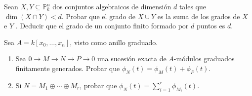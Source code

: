 \documentclass[twoside]{article}
\begin{document}
\newpage

\begin{ejercicio}{2}
 
Sean $X, Y ⊆ \mathbb{P}^n_k$
dos conjuntos algebraicos de dimensión $d$ tales
que $\dim(X ∩Y ) < d$. Probar que el grado de $X ∪Y$ es la suma de los grados de
$X$ e $Y$ . Deducir que el grado de un conjunto finito formado por $d$ puntos es $d$.
\end{ejercicio}

\begin{solucion}
\end{solucion}

\newpage

\begin{ejercicio}{2}
 Sea $A=k[x_0,\dotsc,x_n]$, visto como anillo graduado.
\begin{enumerate}
\item Sea $0\to M\to N\to P \to 0$ una sucesión exacta de $A$-módulos graduados finitamente generados. Probar que $\phi_N(t)=\phi_M(t)+\phi_P(t)$.
\item Si $N=M_1\oplus\cdots\oplus M_r$, probar que $\phi_N(t)=\sum_{i=1}^r\phi_{M_i}(t)$.
\end{enumerate}
\end{ejercicio}
\end{document}
